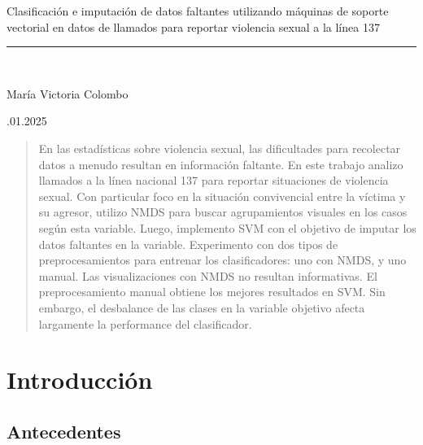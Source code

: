 \documentclass[10 pt]{article}
\begin{document}
\begin{titlepage}
\begin{center}
\begin{large}
    \vspace*{0.15in}
    Clasificación e imputación de datos faltantes utilizando máquinas de soporte vectorial en datos de llamados para reportar violencia sexual a la línea 137 \\
    
    
    \end{large}
    \vspace*{0.2in}
    \vspace*{0.3in}
    
    
    \vspace*{0.3in}
    \rule{80mm}{0.1mm}\\
    \vspace*{0.1in}
    \begin{large}
    María Victoria Colombo
    
    \vspace*{0.3in}
    
    \vspace*{0.1in}.01.2025
    \end{large}
    \end{center}
    
    \end{titlepage}

\newpage

\begin{abstract}
    En las estadísticas sobre violencia sexual, las dificultades para recolectar datos a menudo resultan en información faltante. En este trabajo analizo llamados a la línea nacional 137 para reportar situaciones de violencia sexual. Con particular foco en la situación convivencial entre la víctima y su agresor, utilizo NMDS para buscar agrupamientos visuales en los casos según esta variable. Luego, implemento SVM con el objetivo de imputar los datos faltantes en la variable. Experimento con dos tipos de preprocesamientos para entrenar los clasificadores: uno con NMDS, y uno manual. Las visualizaciones con NMDS no resultan informativas. El preprocesamiento manual obtiene los mejores resultados en SVM. Sin embargo, el desbalance de las clases en la variable objetivo afecta largamente la performance del clasificador.  
\end{abstract}
\newpage
\tableofcontents
\newpage

\section{Introducción}\label{intro}

\subsection{Antecedentes}
\end{document}

